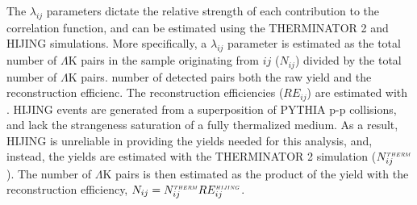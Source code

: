 \documentclass[ALICE,manyauthors]{cernphprep}
\newcommand{\LamK}{$\Lambda$K\xspace}
\begin{document}
The $\lambda_{ij}$ parameters dictate the relative strength of each contribution to the correlation function, and can be estimated using the THERMINATOR 2 and HIJING simulations.
More specifically, a $\lambda_{ij}$ parameter is estimated as the total number of \LamK pairs in the {\color{red}{experimental}} sample originating from {\color{blue}{source}} $ij$ ($N_{ij}$) divided by the total number of \LamK pairs.
{\color{red}{The}} {\color{blue}{For a given \LamK source, the}} number of detected {\color{red}{\LamK}} pairs {\color{red}{involves}} {\color{blue}{depends on}} both the raw yield{\color{red}{s}} and the reconstruction efficienc{\color{red}{ies}}{\color{blue}{y}}.
The reconstruction efficiencies ($RE_{ij}$) are estimated with {\color{red}{MC HIJING data, which have been run through GEANT to simulate the detector response}} {\color{blue}{HIJING simulations using GEANT3 to model particle transport through the detector}}.
HIJING events are generated from a superposition of PYTHIA p-p collisions, and lack the strangeness saturation of a fully thermalized medium.
As a result, HIJING is unreliable in providing the yields needed for this analysis, and, instead, the yields are estimated with the THERMINATOR 2 simulation ($N_{ij}^{\scaleto{THERM}{3pt}}$).
The number of \LamK pairs {\color{blue}{from source $ij$}} is then estimated as the product of the yield with the {\color{blue}{associated}} reconstruction efficiency, $N_{ij} = N_{ij}^{\scaleto{THERM}{3pt}}RE_{ij}^{\scaleto{HIJING}{3pt}}$.
{}
\end{document}
